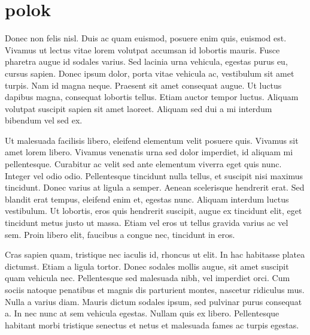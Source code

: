 \documentclass[10pt]{llncs}
\begin{document}
\section{polok}

Donec non felis nisl. Duis ac quam euismod, posuere enim quis, euismod est. Vivamus ut lectus vitae lorem volutpat accumsan id lobortis mauris. Fusce pharetra augue id sodales varius. Sed lacinia urna vehicula, egestas purus eu, cursus sapien. Donec ipsum dolor, porta vitae vehicula ac, vestibulum sit amet turpis. Nam id magna neque. Praesent sit amet consequat augue. Ut luctus dapibus magna, consequat lobortis tellus. Etiam auctor tempor luctus. Aliquam volutpat suscipit sapien sit amet laoreet. Aliquam sed dui a mi interdum bibendum vel sed ex.

Ut malesuada facilisis libero, eleifend elementum velit posuere quis. Vivamus sit amet lorem libero. Vivamus venenatis urna sed dolor imperdiet, id aliquam mi pellentesque. Curabitur ac velit sed ante elementum viverra eget quis nunc. Integer vel odio odio. Pellentesque tincidunt nulla tellus, et suscipit nisi maximus tincidunt. Donec varius at ligula a semper. Aenean scelerisque hendrerit erat. Sed blandit erat tempus, eleifend enim et, egestas nunc. Aliquam interdum luctus vestibulum. Ut lobortis, eros quis hendrerit suscipit, augue ex tincidunt elit, eget tincidunt metus justo ut massa. Etiam vel eros ut tellus gravida varius ac vel sem. Proin libero elit, faucibus a congue nec, tincidunt in eros.

Cras sapien quam, tristique nec iaculis id, rhoncus ut elit. In hac habitasse platea dictumst. Etiam a ligula tortor. Donec sodales mollis augue, sit amet suscipit quam vehicula nec. Pellentesque sed malesuada nibh, vel imperdiet orci. Cum sociis natoque penatibus et magnis dis parturient montes, nascetur ridiculus mus. Nulla a varius diam. Mauris dictum sodales ipsum, sed pulvinar purus consequat a. In nec nunc at sem vehicula egestas. Nullam quis ex libero. Pellentesque habitant morbi tristique senectus et netus et malesuada fames ac turpis egestas.

\cite{*}




\end{document}
